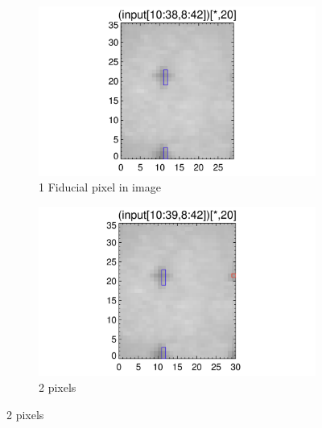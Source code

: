 \documentclass[10pt]{article}
\begin{document}
\begin{figure}[!h]
    \centering 
    \begin{subfigure}[b]{.45\linewidth}
        \centering
        \includegraphics[width=1.3\textwidth]{../plots_tables_images/fidcheck_withbothtruncate0.png}
        \caption{1 Fiducial pixel in image}
    \end{subfigure}
    \begin{subfigure}[b]{.45\linewidth}
        \centering
        \includegraphics[width=1.3\textwidth]{../plots_tables_images/fidcheck_withbothtruncate1.png}
        \caption{2 pixels}
    \end{subfigure}
   

\end{figure}
\end{document}
